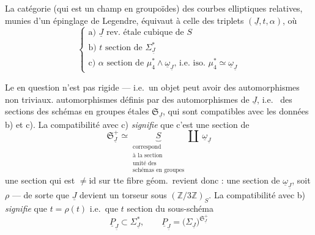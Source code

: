 \documentclass[11pt,a4paper]{article}
\begin{document}
La catégorie   (qui est un champ en
groupoïdes) des courbes elliptiques relatives, munies d'un épinglage de
Legendre, équivaut à celle des triplets $(\underline{J}, t, \alpha)$, où
\[
  \begin{cases}
    \text{a) } \underline{J} \text{ rev.\ étale cubique de } S \\
    \text{b) } t \text{ section de } \Sigma_{\underline{J}}^* \\
    \text{c) } \alpha \text{ section de } \mu_4^{*} \wedge \underline{\omega}_{\underline{J}}
      \text{, i.e.\ iso.\ } \mu_4^{*} \simeq \underline{\omega}_{\underline{J}}
  \end{cases}
\]

Le   en question n'est pas rigide --- i.e.\ un
objet peut avoir des automorphismes non triviaux.
  automorphismes   \add{\ill{}} définis par des
automorphismes de $\underline{J}$, i.e.\  des sections des
schémas en groupes étales $\mathfrak{S}_{\underline{J}}$, qui sont
compatibles avec les données b) et c). La compatibilité avec c)
\emph{signifie} que c'est une section de
\[
  \mathfrak{S}_{\underline{J}}^{+} \simeq
  \underbrace{S}_{\substack{\text{correspond}\\ \text{à la section}\\
  \text{unité des}\\ \text{schémas en groupes}}}
  \amalg\ \underline{\omega}_{\underline{J}}
\]
une section qui est $\neq \mathrm{id}$ sur tte fibre géom.\ revient donc
: une section de $\underline{\omega}_{\underline{J}}$, soit $\rho$ --- de
sorte que $\underline{J}$ devient un torseur sous
$(\mathbb{Z}/3\mathbb{Z})_S$. La compatibilité avec b)
\emph{signifie} que $t = \rho(t)$ i.e.\ que $t$ 
 section du sous-schéma
\[
  \underline{P}_{\underline{J}} \subset \Sigma_{\underline{J}}^*,
  \qquad \underline{P}_{\underline{J}} =
  \bigl(\Sigma_{\underline{J}}\bigr)^{\mathfrak{S}_{\underline{J}}^{+}}
\]
\end{document}
